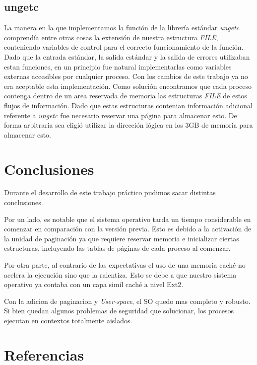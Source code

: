 \documentclass[a4paper,10pt]{article}
\begin{document}
	\subsection{ungetc}

	La manera en la que implementamos la función de la librería estándar \textit{ungetc} comprendía entre otras cosas la
	extensión de nuestra estructura \textit{FILE}, conteniendo variables de control para el correcto funcionamiento de la función.
	Dado que la entrada estándar, la salida estándar y la salida de errores utilizaban estan funciones, en un principio fue		
	natural implementarlas como variables externas accesibles por cualquier proceso. Con los cambios de este trabajo ya no era
	aceptable esta implementación.
	Como solución encontramos que cada proceso contenga dentro de un area reservada de memoria las estructuras \textit{FILE} de 
	estos flujos de información. Dado que estas estructuras contenian información adicional referente a \textit{ungetc} fue 
	necesario reservar una página para almacenar esto. De forma arbitraria sea eligió utilizar la dirección lógica en los 3GB 
	de memoria para almacenar esto.

\newpage

\section{Conclusiones}

Durante el desarrollo de este trabajo práctico pudimos sacar distintas conclusiones.

Por un lado, es notable que el sistema operativo tarda un tiempo considerable en comenzar en comparación con la versión previa.
Esto es debido a la activación de la unidad de paginación ya que requiere reservar memoria e inicializar ciertas estructuras, 
incluyendo las tablas de páginas de cada proceso al comenzar. 

Por otra parte, al contrario de las expectativas el uso de una memoria caché no acelera la ejecución sino que la ralentiza. Esto se
debe a que nuestro sistema operativo ya contaba con un capa simil caché a nivel Ext2. 

Con la adicion de paginacion y \textit{User-space}, el SO quedo mas completo y robusto.
Si bien quedan algunos problemas de seguridad que solucionar, los procesos ejecutan en contextos totalmente aislados.

\newpage     
\section{Referencias}
\end{document}
